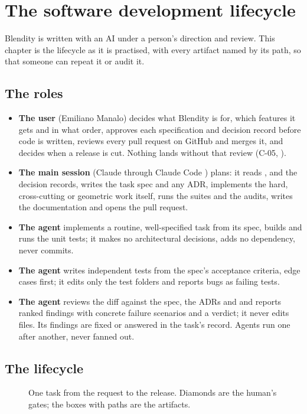 \chapter{The software development lifecycle}
\label{ch:sdlc}

Blendity is written with an AI under a person's direction and review. This chapter is the lifecycle as it is
practised, with every artifact named by its path, so that someone can repeat it or audit it.

\section{The roles}
\begin{itemize}
  \item \textbf{The user} (Emiliano Manalo) decides what Blendity is for, which features it gets and in what order,
    approves each specification and decision record before code is written, reviews every pull request on GitHub and
    merges it, and decides when a release is cut. Nothing lands without that review (C-05, ).
  \item \textbf{The main session} (Claude through Claude Code \cite{ClaudeCode2026}) plans: it reads
    ,  and the decision records, writes the task spec and any
    ADR, implements the hard, cross-cutting or geometric work itself, runs the suites and the audits, writes the
    documentation and opens the pull request.
  \item \textbf{The  agent} implements a routine, well-specified task from its spec, builds and runs
    the unit tests; it makes no architectural decisions, adds no dependency, never commits.
  \item \textbf{The  agent} writes independent tests from the spec's acceptance criteria, edge cases
    first; it edits only the test folders and reports bugs as failing tests.
  \item \textbf{The  agent} reviews the diff against the spec, the ADRs and  and
    reports ranked findings with concrete failure scenarios and a verdict; it never edits files. Its findings are fixed
    or answered in the task's record. Agents run one after another, never fanned out.
\end{itemize}

\section{The lifecycle}
\begin{figure}[H]
  \centering
  \resizebox{\textwidth}{!}{}
  \caption{One task from the request to the release. Diamonds are the human's gates; the boxes with paths are the artifacts.}
  \label{fig:sdlc}
\end{figure}

